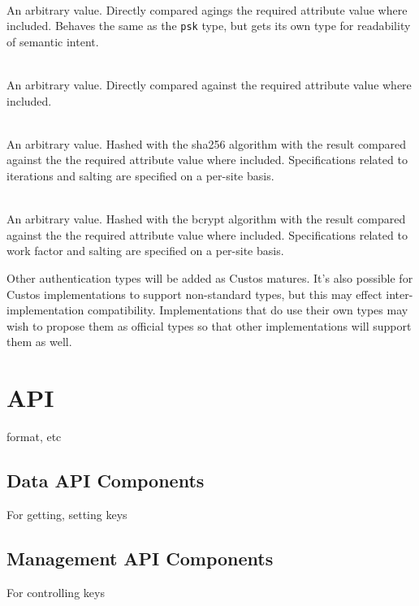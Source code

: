 \begin{packed_desc}
\item[\texttt{user\_id}] \hfill \\ An arbitrary value. Directly
  compared agings the required attribute value where included. Behaves
  the same as the \texttt{psk} type, but gets its own type for
  readability of semantic intent.
\item[\texttt{psk}] \hfill \\ An arbitrary value. Directly
  compared against the required attribute value where included.
\item[\texttt{psk\_sha256}] \hfill \\ An arbitrary value. Hashed with
  the sha256 algorithm with the result compared against the the
  required attribute value where included. Specifications related to
  iterations and salting are specified on a per-site basis.
\item[\texttt{psk\_bcrypt}] \hfill \\ An arbitrary value. Hashed with
  the bcrypt algorithm with the result compared against the the
  required attribute value where included. Specifications related to
  work factor and salting are specified on a per-site basis.
\end{packed_desc}

Other authentication types will be added as Custos matures. It's also
possible for Custos implementations to support non-standard types, but
this may effect inter-implementation compatibility. Implementations
that do use their own types may wish to propose them as official types
so that other implementations will support them as well.

\section{API}

format, etc

\subsection{Data API Components}

For getting, setting keys

\subsection{Management API Components}

For controlling keys

